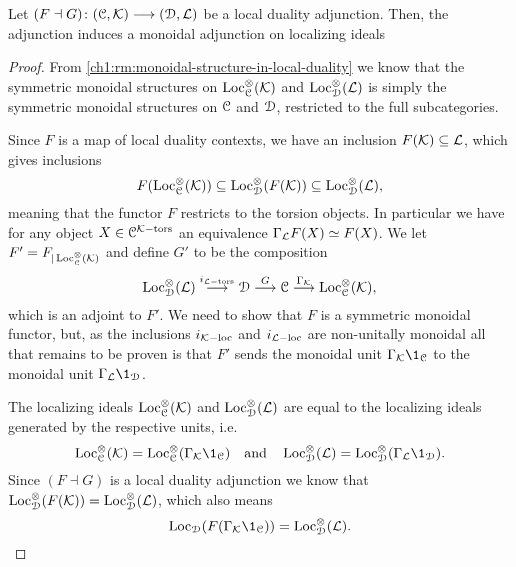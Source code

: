 \begin{lemma}
    \label{ch1:lm:induced-torsion-adjunction}
    Let $(F\dashv G)\colon (\EuScript{C}, \mathcal{K})\longrightarrow (\EuScript{D}, \mathcal{L})$ be a local duality adjunction. Then, the adjunction induces a monoidal adjunction on localizing ideals
    \begin{center}
    \end{center}
\end{lemma}
\begin{proof}
    From \cref{ch1:rm:monoidal-structure-in-local-duality} we know that the symmetric monoidal structures on $\operatorname{Loc}^\otimes_{\EuScript{C}}(\mathcal{K})$ and $\operatorname{Loc}^\otimes_{\EuScript{D}}(\mathcal{L})$ is simply the symmetric monoidal structures on $\EuScript{C}$ and $\EuScript{D}$, restricted to the full subcategories. 
    
    Since $F$ is a map of local duality contexts, we have an inclusion $F(\mathcal{K})\subseteq \mathcal{L}$, which gives inclusions  
    \[F(\operatorname{Loc}^\otimes_{\EuScript{C}}(\mathcal{K}))\subseteq \operatorname{Loc}^\otimes_{\EuScript{D}}(F(\mathcal{K}))\subseteq \operatorname{Loc}^\otimes_{\EuScript{D}}(\mathcal{L}),\]
    meaning that the functor $F$ restricts to the torsion objects. In particular we have for any object $X\in \EuScript{C}^{\mathcal{K}-\mathrm{tors}}$ an equivalence $\Gamma_{\mathcal{L}} F(X) \simeq F(X)$. We let $F'=F_{|\operatorname{Loc}^\otimes_{\EuScript{C}}(\mathcal{K})}$ and define $G'$ to be the composition 
    \[\operatorname{Loc}^{\otimes}_{\EuScript{D}}(\mathcal{L})\overset{i_{\mathcal{L}-\mathrm{tors}}}\longrightarrow \EuScript{D}\overset{G}\longrightarrow \EuScript{C}\overset{\Gamma_{\mathcal{K}}}\longrightarrow \operatorname{Loc}_{\EuScript{C}}^{\otimes}(\mathcal{K}),\]
    which is an adjoint to $F'$. We need to show that $F$ is a symmetric monoidal functor, but, as the inclusions $i_{\mathcal{K}-\mathrm{loc}}$ and $i_{\mathcal{L}-\mathrm{loc}}$ are non-unitally monoidal all that remains to be proven is that $F'$ sends the monoidal unit $\Gamma_\K \1_\C$ to the monoidal unit $\Gamma_\L \1_\D$. 

    The localizing ideals $\operatorname{Loc}_{\EuScript{C}}^\otimes(\mathcal{K})$ and $\operatorname{Loc}_{\EuScript{D}}^\otimes(\mathcal{L})$ are equal to the localizing ideals generated by the respective units, i.e. 
    \[\Loc_\C^\otimes(\K) = \Loc_\C^\otimes(\Gamma_\K\1_\C) \quad \text{and}\quad \Loc_\D^\otimes(\L) = \Loc_\D^\otimes(\Gamma_\L\1_\D).\]
    Since $(F\dashv G)$ is a local duality adjunction we know that $\operatorname{Loc}^\otimes_{\EuScript{D}}(F(\mathcal{K}))= \operatorname{Loc}_{\EuScript{D}}^\otimes(\mathcal{L})$, which also means 
    \[\Loc_\D(F(\Gamma_\K \1_\C)) = \Loc_\D^\otimes(\L).\]


\end{proof}
